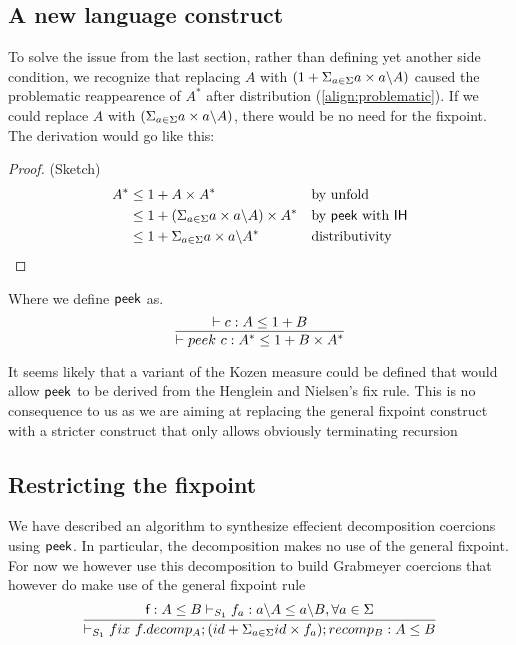 \documentclass[a4paper,UKenglish,cleveref, autoref, thm-restate]{lipics-v2021}
\begin{document}
\subsection{A new language construct}
To solve the issue from the last section, rather than defining yet another side condition, we recognize that replacing $A$ with $(1 + \Sigma_{a \in \Sigma} a\times a \backslash A)$ caused the problematic reappearence of $A^*$ after distribution (\ref{align:problematic}). If we could replace $A$ with $(\Sigma_{a \in \Sigma} a\times a \backslash A)$, there would be no need for the fixpoint. The derivation would go like this:
\begin{proof} (Sketch)
\begin{align}
A^* &\leq  1 + A \times A^* && \text{by unfold}\\
 &\leq 1 + (\Sigma_{a \in \Sigma} a\times a \backslash A) \times A^* && \text{by } \textsf{peek}~\text{with }\textsf{IH}\\
 &\leq 1 + \Sigma_{a \in \Sigma} a\times a \backslash A^* && \text{distributivity} 
\end{align}
\end{proof}
Where we define $\textsf{peek}$ as.
\[ \infer{\contains{}{peek ~ c}{A^*}{1 + B \times A^*}}{\contains{}{c}{A}{1 + B}} \]
\begin{remark}
It seems likely that a variant of the Kozen measure could be defined that would allow $\textsf{peek}$ to be derived from the Henglein and Nielsen's fix rule. This is no consequence to us as we are aiming at replacing the general fixpoint construct with a stricter construct that only allows obviously terminating recursion
\end{remark}

\subsection{Restricting the fixpoint}
We have described an algorithm to synthesize effecient decomposition coercions using $\textsf{peek}$. In particular, the decomposition makes no use of the general fixpoint. For now we however use this decomposition to build Grabmeyer coercions that however do make use of the general fixpoint rule
\[\infer{\containsP{}{\fix ~f.decomp_A;(id + \Sigma_{a \in \Sigma} id\times f_a); recomp_B}{A}{B}{S_1}}{\containsP{\dslcom{f} : A \leq B}{f_a}{\derive{a}{A}}{\derive{a}{B}}{S_1}, \forall a \in \Sigma} \]

\end{document}
